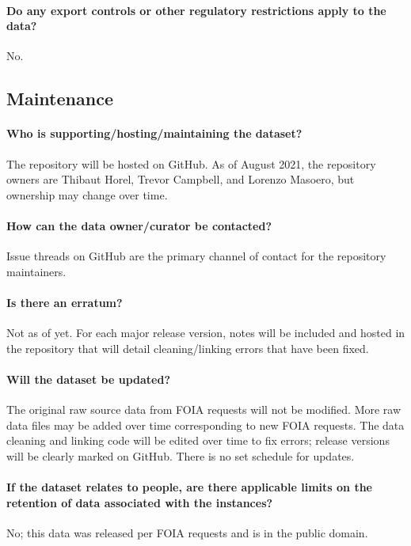 \paragraph{Do any export controls or other regulatory restrictions apply to the data?}
No.

\subsection{Maintenance}

\paragraph{Who is supporting/hosting/maintaining the dataset?}
The repository will be hosted on GitHub. As of August 2021, the repository
owners are Thibaut Horel, Trevor Campbell, and Lorenzo Masoero, but ownership
may change over time.

\paragraph{How can the data owner/curator be contacted?}
Issue threads on GitHub are the primary channel of contact for the repository maintainers.

\paragraph{Is there an erratum?}
Not as of yet. For each major release version, notes will be included and
hosted in the repository that will detail cleaning/linking errors that have been fixed.

\paragraph{Will the dataset be updated?}
The original raw source data from FOIA requests will not be modified. More raw
data files may be added over time corresponding to new FOIA requests. The data
cleaning and linking code will be edited over time to fix errors; release
versions will be clearly marked on GitHub. There is no set schedule for updates.

\paragraph{If the dataset relates to people, are there applicable limits on the retention of data associated with the instances?}
No; this data was released per FOIA requests and is in the public domain.


